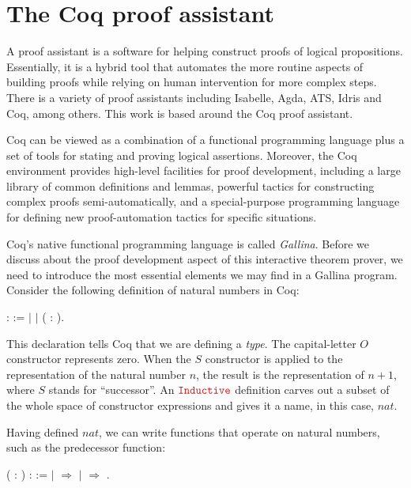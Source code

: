 \section{The Coq proof assistant}
\label{section:coq}

A proof assistant is a software for helping construct proofs of logical propositions. Essentially, it is a hybrid tool that automates the more routine aspects of building proofs while relying on human intervention for more complex steps. There is a variety of proof assistants including Isabelle, Agda, ATS, Idris and Coq, among others. This work is based around the Coq proof assistant.

Coq can be viewed as a combination of a functional programming language plus a set of tools for stating and proving logical assertions. Moreover, the Coq environment provides high-level facilities for proof development, including a large library of common definitions and lemmas, powerful tactics for constructing complex proofs semi-automatically, and a special-purpose programming language for defining new proof-automation tactics for specific situations.

Coq's native functional programming language is called \emph{Gallina}. Before we discuss about the proof development aspect of this interactive theorem prover, we need to introduce the most essential elements we may find in a Gallina program. Consider the following definition of natural numbers in Coq:

\begin{coqdoccode}
	\coqdocnoindent
	  :  :=\coqdoceol
	\coqdocindent{1.00em}
	\ensuremath{|} \coqdoceol
	\coqdocindent{1.00em}
	\ensuremath{|}  ( : ).\coqdoceol
\end{coqdoccode}

This declaration tells Coq that we are defining a \emph{type}. The capital-letter $ O $ constructor represents zero. When the $ S $ constructor is applied to the representation of the natural number $ n $, the result is the representation of $ n+1 $, where $ S $ stands for ``successor''. An $ \coqdockw{Inductive} $ definition carves out a subset of the whole space of constructor expressions and gives it a name, in this case, $ nat $.

Having defined $ nat $, we can write functions that operate on natural numbers, such as the predecessor function:

\begin{coqdoccode}
	\coqdocnoindent
	  ( : ) :  :=\coqdoceol
	\coqdocindent{1.00em}
	  \coqdoceol
	\coqdocindent{2.00em}
	\ensuremath{|}  \ensuremath{\Rightarrow} \coqdoceol
	\coqdocindent{2.00em}
	\ensuremath{|}   \ensuremath{\Rightarrow} \coqdoceol
	\coqdocindent{1.00em}
	.\coqdoceol
\end{coqdoccode}

